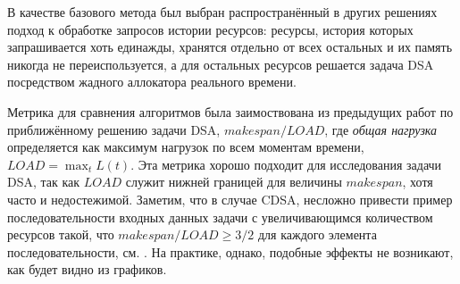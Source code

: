 В качестве базового метода был выбран распространённый в других решениях подход к обработке запросов истории ресурсов: ресурсы, история которых запрашивается хоть единажды, хранятся отдельно от всех остальных и их память никогда не переиспользуется, а для остальных ресурсов решается задача DSA посредством жадного аллокатора реального времени.

Метрика для сравнения алгоритмов была заимоствована из предыдущих работ по приближённому решению задачи DSA, $makespan/LOAD$, где \textit{общая нагрузка} определяется как максимум нагрузок по всем моментам времени, $LOAD = \max_t L(t)$.
Эта метрика хорошо подходит для исследования задачи DSA, так как $LOAD$ служит нижней границей для величины $makespan$, хотя часто и недостежимой.
Заметим, что в случае CDSA, несложно привести пример последовательности входных данных задачи с увеличивающимся количеством ресурсов такой, что $makespan/LOAD \geqslant 3/2$ для каждого элемента последовательности, см. .
На практике, однако, подобные эффекты не возникают, как будет видно из графиков.

